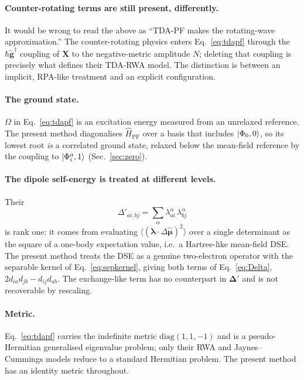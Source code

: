 \documentclass[11pt]{article}
\newcommand{\lam}{\bm{\lambda}}
\begin{document}
\paragraph{Counter-rotating terms are still present, differently.} It would be
wrong to read the above as ``TDA-PF makes the rotating-wave approximation.'' The
counter-rotating physics enters Eq.~\eqref{eq:tdapf} through the
$\hbar\tilde{\bm{g}}^{\dagger}$ coupling of $\bm{X}$ to the negative-metric
amplitude $N$; deleting that coupling is precisely what defines their TDA-RWA
model. The distinction is between an implicit, RPA-like treatment and an
explicit configuration.

\paragraph{The ground state.} $\Omega$ in Eq.~\eqref{eq:tdapf} is an excitation
energy measured from an unrelaxed reference. The present method diagonalises
$\hat{H}_{\mathrm{PF}}$ over a basis that includes $\ket{\Phi_0,0}$, so its
lowest root \emph{is} a correlated ground state, relaxed below the mean-field
reference by the coupling to $\ket{\Phi_i^a,1}$ (Sec.~\ref{sec:zero}).

\paragraph{The dipole self-energy is treated at different levels.} Their
\begin{equation}
\Delta'_{ai,bj} = \sum_\alpha \lambda^\alpha_{ai}\,\lambda^\alpha_{bj}
\end{equation}
is rank one: it comes from evaluating $\langle(\lam\cdot\Delta\hat{\bm{\mu}})^2\rangle$
over a single determinant as the square of a one-body expectation value, i.e.\ a
Hartree-like mean-field DSE. The present method treats the DSE as a genuine
two-electron operator with the separable kernel of Eq.~\eqref{eq:sepkernel},
giving both terms of Eq.~\eqref{eq:Delta},
$2 d_{ia} d_{jb} - d_{ij} d_{ab}$. The exchange-like term has no counterpart in
$\bm{\Delta}'$ and is not recoverable by rescaling.

\paragraph{Metric.} Eq.~\eqref{eq:tdapf} carries the indefinite metric
$\mathrm{diag}(1,1,-1)$ and is a pseudo-Hermitian generalised eigenvalue problem;
only their RWA and Jaynes--Cummings models reduce to a standard Hermitian
problem. The present method has an identity metric throughout.
\end{document}
